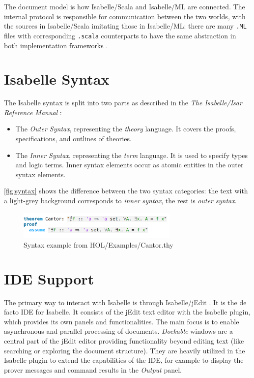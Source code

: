 The document model is how Isabelle/Scala and Isabelle/ML are
connected. The internal protocol is responsible for
communication between the two worlds, with the sources in Isabelle/Scala
imitating those in Isabelle/ML: there are many \texttt{.ML} files with
corresponding \texttt{.scala} counterparts to have the same 
abstraction in both implementation frameworks \cite{Wenzel2012}.

\section{Isabelle Syntax}
The Isabelle syntax is split into two parts as described in the
\textit{The Isabelle/Isar Reference Manual} \cite{isabelle-isar-ref}:
\begin{itemize}
    \item The \textit{Outer Syntax}, representing the \textit{theory} language.
    It covers the proofs, specifications, and outlines of theories.
    \item The \textit{Inner Syntax}, representing the \textit{term} language.
    It is used to specify types and logic terms. Inner syntax elements occur
    as atomic entities in the outer syntax elements.
\end{itemize}
\autoref{fig:syntax} shows the difference between the two syntax categories:
the text with a light-grey background corresponds to \textit{inner syntax},
the rest is \textit{outer syntax}.
\begin{figure}[htpb]
    \centering
    \includegraphics[width=0.7\textwidth]{images/syntax.png}
    \caption[Example Syntax]{Syntax example from HOL/Examples/Cantor.thy}\label{fig:syntax}
\end{figure}

\section{IDE Support}
The primary way to interact with Isabelle is through Isabelle/jEdit \cite{isabelle-jedit}. It is
the de facto IDE for Isabelle. It consists of the jEdit text editor with the Isabelle
plugin, which provides its own panels and functionalities. The main focus is
to enable asynchronous and parallel processing of documents. \textit{Dockable}
windows are a central part of the jEdit editor providing functionality beyond
editing text (like searching or exploring the document structure). They are heavily 
utilized in the Isabelle plugin to
extend the capabilities of the IDE, for example to display the prover messages
and command results in the \textit{Output} panel.

